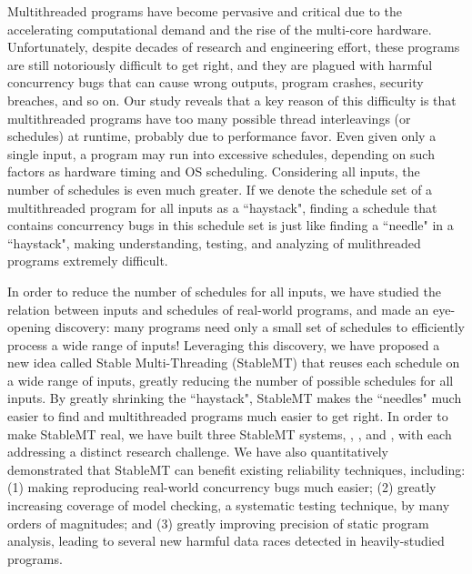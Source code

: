 Multithreaded programs have become pervasive and critical due to the
accelerating computational demand and the rise of the multi-core hardware.
Unfortunately, despite decades of research and engineering effort, these
programs are still notoriously difficult to get right, and they are plagued with
harmful concurrency bugs that can cause wrong outputs, program crashes, security
breaches, and so on. Our study reveals that a key reason of this difficulty is
that multithreaded programs have too many possible thread interleavings (or
schedules) at runtime, probably due to performance favor. Even given only a
single input, a program may run into excessive schedules, depending on such
factors as hardware timing and OS scheduling. Considering all inputs, the number
of schedules is even much greater. If we denote the schedule set of a
multithreaded program for all inputs as a ``haystack", finding a schedule that
contains concurrency bugs in this schedule set is just like finding a ``needle"
in a ``haystack", making understanding, testing, and analyzing of mulithreaded
programs extremely difficult.

In order to reduce the number of schedules for all inputs, we have studied the
relation between inputs and schedules of real-world programs, and made an
eye-opening discovery: many programs need only a small set of schedules to
efficiently process a wide range of inputs! Leveraging this discovery, we have
proposed a new idea called Stable Multi-Threading (StableMT) that reuses each
schedule on a wide range of inputs, greatly reducing the number of possible
schedules for all inputs. By greatly shrinking the ``haystack", StableMT makes
the ``needles" much easier to find and multithreaded programs much
easier to get right. In order to make StableMT real, we have built three
StableMT systems, \tern, \peregrine, and \parrot, with each addressing a
distinct research challenge. We have also quantitatively demonstrated that
StableMT can benefit existing reliability techniques, including: (1)
making reproducing real-world concurrency bugs much easier; (2) greatly
increasing coverage of model checking, a systematic testing technique,
by many orders of magnitudes; and (3) greatly improving precision of static
program analysis, leading to several new harmful data races detected
in heavily-studied programs.

